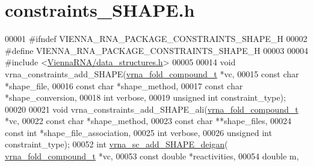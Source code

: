 \hypertarget{constraints__SHAPE_8h_source}{}\section{constraints\+\_\+\+S\+H\+A\+P\+E.\+h}
\label{constraints__SHAPE_8h_source}

\begin{DoxyCode}
00001 \textcolor{preprocessor}{#ifndef VIENNA\_RNA\_PACKAGE\_CONSTRAINTS\_SHAPE\_H}
00002 \textcolor{preprocessor}{#define VIENNA\_RNA\_PACKAGE\_CONSTRAINTS\_SHAPE\_H}
00003 
00004 \textcolor{preprocessor}{#include <\mbox{\hyperlink{data__structures_8h}{ViennaRNA/data\_structures.h}}>}
00005 
00014 \textcolor{keywordtype}{void} vrna\_constraints\_add\_SHAPE(\mbox{\hyperlink{group__fold__compound_structvrna__fc__s}{vrna\_fold\_compound\_t}} *vc,
00015                                 \textcolor{keyword}{const} \textcolor{keywordtype}{char} *shape\_file,
00016                                 \textcolor{keyword}{const} \textcolor{keywordtype}{char} *shape\_method,
00017                                 \textcolor{keyword}{const} \textcolor{keywordtype}{char} *shape\_conversion,
00018                                 \textcolor{keywordtype}{int} verbose,
00019                                 \textcolor{keywordtype}{unsigned} \textcolor{keywordtype}{int} constraint\_type);
00020 
00021 \textcolor{keywordtype}{void} vrna\_constraints\_add\_SHAPE\_ali(\mbox{\hyperlink{group__fold__compound_structvrna__fc__s}{vrna\_fold\_compound\_t}} *vc,
00022                                     \textcolor{keyword}{const} \textcolor{keywordtype}{char} *shape\_method,
00023                                     \textcolor{keyword}{const} \textcolor{keywordtype}{char} **shape\_files,
00024                                     \textcolor{keyword}{const} \textcolor{keywordtype}{int}  *shape\_file\_association,
00025                                     \textcolor{keywordtype}{int} verbose,
00026                                     \textcolor{keywordtype}{unsigned} \textcolor{keywordtype}{int} constraint\_type);
00052 \textcolor{keywordtype}{int} \mbox{\hyperlink{group__SHAPE__reactivities_ga57d612b58e1c61dd6cfcb5a843f8f1b3}{vrna\_sc\_add\_SHAPE\_deigan}}( \mbox{\hyperlink{group__fold__compound_structvrna__fc__s}{vrna\_fold\_compound\_t}} *vc,
00053                               \textcolor{keyword}{const} \textcolor{keywordtype}{double} *reactivities,
00054                               \textcolor{keywordtype}{double} m,

\end{DoxyCode}
